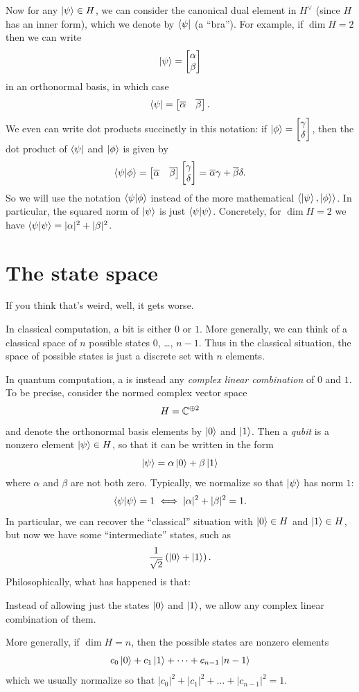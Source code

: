 Now for any $\ket\psi \in H$,
we can consider the canonical dual element in $H^\vee$
(since $H$ has an inner form), which we denote by $\bra\psi$ (a ``bra'').
For example, if $\dim H = 2$ then we can write
\[ \ket\psi = \begin{bmatrix} \alpha \\ \beta \end{bmatrix} \]
in an orthonormal basis, in which case
\[ \bra\psi = \begin{bmatrix} \overline\alpha & \overline\beta \end{bmatrix}. \]
We even can write dot products succinctly in this notation:
if $\ket\phi = \begin{bmatrix} \gamma \\ \delta \end{bmatrix}$,
then the dot product of $\bra\psi$ and $\ket\phi$ is given by
\[
	\braket{\psi|\phi}
	= \begin{bmatrix} \overline\alpha & \overline\beta \end{bmatrix} \begin{bmatrix} \gamma \\ \delta \end{bmatrix}
	= \overline\alpha\gamma + \overline\beta \delta.
\]
So we will use the notation $\braket{\psi|\phi}$
instead of the more mathematical $\left< \ket\psi, \ket\phi \right>$.
In particular, the squared norm of $\ket\psi$ is just $\braket{\psi|\psi}$.
Concretely, for $\dim H = 2$ we have
$\braket{\psi|\psi} = |\alpha|^2 + |\beta|^2$.

\section{The state space}
If you think that's weird, well, it gets worse.

In classical computation, a bit is either $0$ or $1$.
More generally, we can think of a classical space of $n$
possible states $0$, \dots, $n-1$.
Thus in the classical situation, the space of possible states
is just a discrete set with $n$ elements.

In quantum computation, a  is instead
any \emph{complex linear combination} of $0$ and $1$.
To be precise, consider the normed complex vector space
\[ H = \mathbb C^{\oplus 2} \]
and denote the orthonormal basis elements by $\ket0$ and $\ket1$.
Then a \emph{qubit} is a nonzero element $\ket\psi \in H$,
so that it can be written in the form
\[ \ket\psi = \alpha \ket 0 + \beta \ket 1 \]
where $\alpha$ and $\beta$ are not both zero.
Typically, we normalize so that $\ket\psi$ has norm $1$:
\[ \braket{\psi|\psi} = 1 \iff |\alpha|^2 + |\beta|^2 = 1. \]
In particular, we can recover the ``classical'' situation
with $\ket 0 \in H$ and $\ket 1 \in H$,
but now we have some ``intermediate'' states,
such as \[ \frac{1}{\sqrt2} \left(\ket 0 + \ket 1 \right). \]
Philosophically, what has happened is that:
\begin{moral}
	Instead of allowing just the states $\ket 0$ and $\ket 1$,
	we allow any complex linear combination of them.
\end{moral}
More generally, if $\dim H = n$,
then the possible states are nonzero elements
\[ c_0\ket0 + c_1\ket1 + \dots + c_{n-1}\ket{n-1} \]
which we usually normalize so that
$|c_0|^2 + |c_1|^2 + \dots + |c_{n-1}|^2 = 1$.

